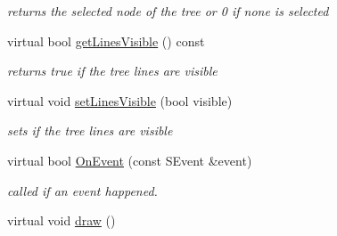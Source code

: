 \begin{DoxyCompactItemize}
\begin{DoxyCompactList}\small\item\em returns the selected node of the tree or 0 if none is selected \end{DoxyCompactList}\item 
\hypertarget{classirr_1_1gui_1_1_c_g_u_i_tree_view_ac3faade2f4bd1a167d38ee99b7320ed2}{virtual bool \hyperlink{classirr_1_1gui_1_1_c_g_u_i_tree_view_ac3faade2f4bd1a167d38ee99b7320ed2}{get\-Lines\-Visible} () const }\label{classirr_1_1gui_1_1_c_g_u_i_tree_view_ac3faade2f4bd1a167d38ee99b7320ed2}

\begin{DoxyCompactList}\small\item\em returns true if the tree lines are visible \end{DoxyCompactList}\item 
\hypertarget{classirr_1_1gui_1_1_c_g_u_i_tree_view_abaeb4ebc9dbe6b4061932877e4d68bbb}{virtual void \hyperlink{classirr_1_1gui_1_1_c_g_u_i_tree_view_abaeb4ebc9dbe6b4061932877e4d68bbb}{set\-Lines\-Visible} (bool visible)}\label{classirr_1_1gui_1_1_c_g_u_i_tree_view_abaeb4ebc9dbe6b4061932877e4d68bbb}

\begin{DoxyCompactList}\small\item\em sets if the tree lines are visible \end{DoxyCompactList}\item 
\hypertarget{classirr_1_1gui_1_1_c_g_u_i_tree_view_a699957982e3965d40a5459fd2e97564c}{virtual bool \hyperlink{classirr_1_1gui_1_1_c_g_u_i_tree_view_a699957982e3965d40a5459fd2e97564c}{On\-Event} (const S\-Event \&event)}\label{classirr_1_1gui_1_1_c_g_u_i_tree_view_a699957982e3965d40a5459fd2e97564c}

\begin{DoxyCompactList}\small\item\em called if an event happened. \end{DoxyCompactList}\item 
\hypertarget{classirr_1_1gui_1_1_c_g_u_i_tree_view_abb9f6c04ee3933b24e13c7d3be31fd08}{virtual void \hyperlink{classirr_1_1gui_1_1_c_g_u_i_tree_view_abb9f6c04ee3933b24e13c7d3be31fd08}{draw} ()}\label{classirr_1_1gui_1_1_c_g_u_i_tree_view_abb9f6c04ee3933b24e13c7d3be31fd08}


\end{DoxyCompactItemize}
